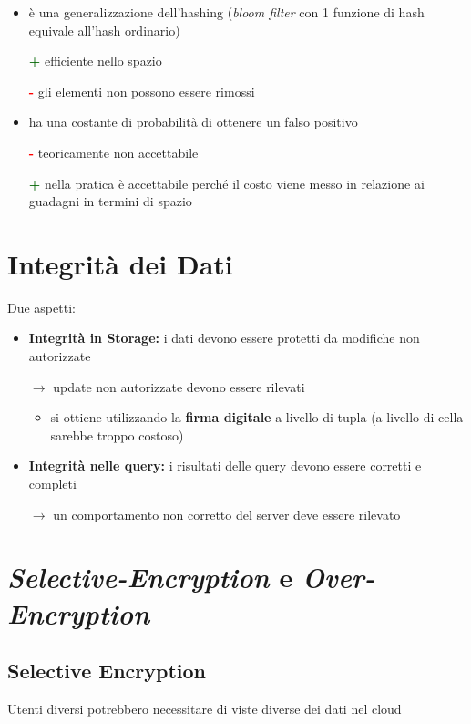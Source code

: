 \documentclass{report}
\begin{document}
\begin{itemize}
    \item è una generalizzazione dell'hashing (\textit{bloom filter} con 1 funzione di hash equivale all'hash ordinario)
    
    \textcolor{darkgreen}{\textbf{+}} efficiente nello spazio
    
    \textcolor{red}{\textbf{-}} gli elementi non possono essere rimossi

    \item ha una costante di probabilità di ottenere un falso positivo

    \textcolor{red}{\textbf{-}} teoricamente non accettabile 

    \textcolor{darkgreen}{\textbf{+}} nella pratica è accettabile perché il costo viene messo in relazione ai guadagni in termini di spazio
\end{itemize}

\newpage
\section{Integrità dei Dati}
Due aspetti:
\begin{itemize}
    \item \textbf{Integrità in Storage:} i dati devono essere protetti da modifiche non autorizzate
    
    $\rightarrow$ update non autorizzate devono essere rilevati
    \begin{itemize}
        \item si ottiene utilizzando la \textbf{firma digitale} a livello di tupla (a livello di cella sarebbe troppo costoso)
    \end{itemize}

    \item \textbf{Integrità nelle query:} i risultati delle query devono essere corretti e completi
    
    $\rightarrow$ un comportamento non corretto del server deve essere rilevato
\end{itemize}

\section{\textit{Selective-Encryption} e \textit{Over-Encryption}}
\subsection{Selective Encryption}
Utenti diversi potrebbero necessitare di viste diverse dei dati nel cloud
\end{document}
